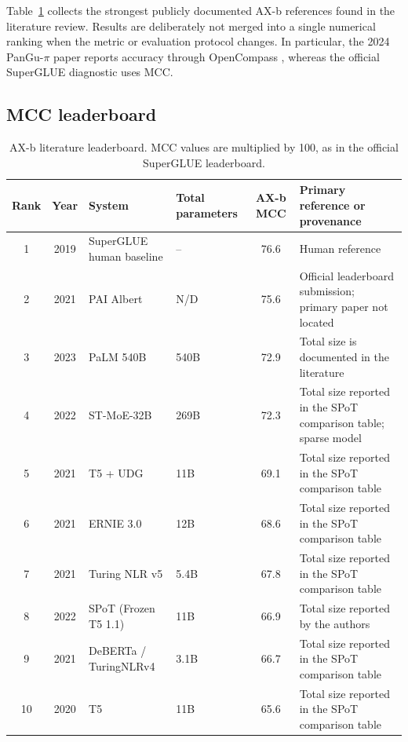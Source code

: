 \documentclass[10pt]{article}
\begin{document}
Table~\ref{tab:literature} collects the strongest publicly documented AX-b
references found in the literature review. Results are deliberately not
merged into a single numerical ranking when the metric or evaluation protocol
changes. In particular, the 2024 PanGu-$\pi$ paper reports accuracy through
OpenCompass \cite{opencompass2023}, whereas the official SuperGLUE diagnostic
uses MCC.

\subsection*{MCC leaderboard}
\small
\begin{longtable}{@{}c c p{3.7cm} p{2.5cm} c p{4.3cm}@{}}
\caption{AX-b literature leaderboard. MCC values are multiplied by 100, as in
the official SuperGLUE leaderboard.}\label{tab:literature}\\
\toprule
\textbf{Rank} & \textbf{Year} & \textbf{System} & \textbf{Total parameters} & \textbf{AX-b MCC} & \textbf{Primary reference or provenance} \\
\midrule
1 & 2019 & SuperGLUE human baseline & -- & 76.6 & Human reference \cite{wang2019superglue} \\
2 & 2021 & PAI Albert & N/D & 75.6 & Official leaderboard submission; primary paper not located \\
3 & 2023 & PaLM 540B & 540B & 72.9 & Total size is documented in the literature \cite{tedeschi2023superhuman} \\
4 & 2022 & ST-MoE-32B & 269B & 72.3 & Total size reported in the SPoT comparison table; sparse model \cite{fedus2022stmoe,vu2022spot} \\
5 & 2021 & T5 + UDG & 11B & 69.1 & Total size reported in the SPoT comparison table \cite{wang2021udg,vu2022spot} \\
6 & 2021 & ERNIE 3.0 & 12B & 68.6 & Total size reported in the SPoT comparison table \cite{sun2021ernie,vu2022spot} \\
7 & 2021 & Turing NLR v5 & 5.4B & 67.8 & Total size reported in the SPoT comparison table \cite{gao2021tnlr,vu2022spot} \\
8 & 2022 & SPoT (Frozen T5 1.1) & 11B & 66.9 & Total size reported by the authors \cite{vu2022spot} \\
9 & 2021 & DeBERTa / TuringNLRv4 & 3.1B & 66.7 & Total size reported in the SPoT comparison table \cite{he2021deberta,vu2022spot} \\
10 & 2020 & T5 & 11B & 65.6 & Total size reported in the SPoT comparison table \cite{raffel2020t5,vu2022spot} \\

\end{longtable}
\end{document}
